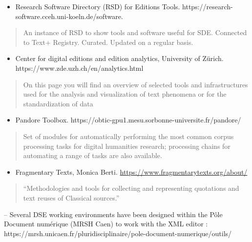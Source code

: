 \documentclass[
  letterpaper,
  DIV=11,
  numbers=noendperiod]{scrreprt}
\providecommand{\tightlist}{%
  \setlength{\itemsep}{0pt}\setlength{\parskip}{0pt}}\usepackage{longtable,booktabs,array}
\begin{document}
\begin{itemize}
\tightlist
\item
  Research Software Directory (RSD) for Editions Tools.
  https://research-software.cceh.uni-koeln.de/software.
\end{itemize}

\begin{quote}
An instance of RSD to show tools and software useful for SDE. Connected
to Text+ Registry. Curated. Updated on a regular basis.
\end{quote}

\begin{itemize}
\tightlist
\item
  Center for digital editions and edition analytics, University of
  Zürich. https://www.zde.uzh.ch/en/analytics.html
\end{itemize}

\begin{quote}
On this page you will find an overview of selected tools and
infrastructures used for the analysis and visualization of text
phenomena or for the standardization of data~
\end{quote}

\begin{itemize}
\tightlist
\item
  Pandore Toolbox.
  https://obtic-gpu1.mesu.sorbonne-universite.fr/pandore/
\end{itemize}

\begin{quote}
Set of modules for automatically performing the most common corpus
processing tasks for digital humanities research; processing chains for
automating a range of tasks are also available.
\end{quote}

\begin{itemize}
\tightlist
\item
  Fragmentary Texts, Monica Berti.
  \url{https://www.fragmentarytexts.org/about/}
\end{itemize}

\begin{quote}
``Methodologies and tools for collecting and representing quotations and
text reuses of Classical sources.''
\end{quote}

-- Several DSE working environments have been designed within the Pôle
Document numérique (MRSH Caen) to work with the XML editor :
https://mrsh.unicaen.fr/pluridisciplinaire/pole-document-numerique/outils/
\end{document}
